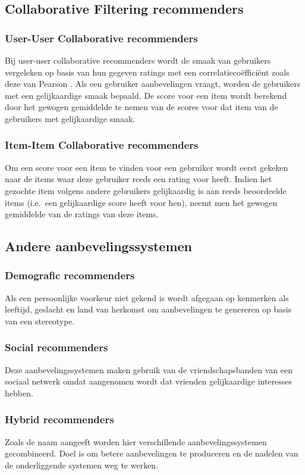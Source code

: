 \subsection{Collaborative Filtering recommenders}
\subsubsection{User-User Collaborative recommenders}
Bij user-user collaborative recommenders wordt de smaak van gebruikers vergeleken op basis van hun gegeven ratings met een  correlatieco\"effici\"ent zoals deze van Pearson \cite{?}. Als een gebruiker aanbevelingen vraagt, worden de gebruikers met een gelijkaardige smaak bepaald. De score voor een item wordt berekend door het gewogen gemiddelde te nemen van de scores voor dat item van de gebruikers met gelijkaardige smaak.
\subsubsection{Item-Item Collaborative recommenders}
Om een score voor een item te vinden voor een gebruiker wordt eerst gekeken naar de items waar deze gebruiker reeds een rating voor heeft. Indien het gezochte item volgens andere gebruikers gelijkaardig is aan reeds beoordeelde items (i.e.~een gelijkaardige score heeft voor hen), neemt men het gewogen gemiddelde van de ratings van deze items.
\subsection{Andere aanbevelingssystemen}
\subsubsection{Demografic recommenders}
Als een persoonlijke voorkeur niet gekend is wordt afgegaan op kenmerken als leeftijd, geslacht en land van herkomst om aanbevelingen te genereren op basis van een stereotype.
\subsubsection{Social recommenders}
Deze aanbevelingssystemen maken gebruik van de vriendschapsbanden van een sociaal netwerk omdat aangenomen wordt dat vrienden gelijkaardige interesses hebben.
\subsubsection{Hybrid recommenders}
Zoals de naam aangeeft worden hier verschillende aanbevelingssystemen gecombineerd. Doel is om betere aanbevelingen te produceren en de nadelen van de onderliggende systemen weg te werken.

